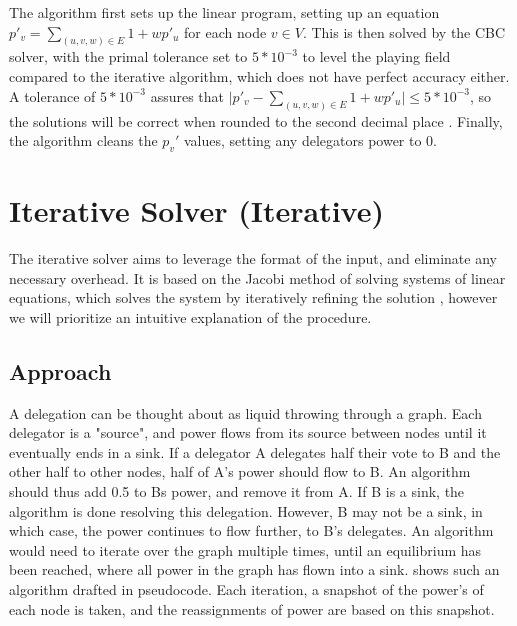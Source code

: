 The algorithm first sets up the linear program, setting up an equation $p'_v = \sum_{(u, v, w) \in E} 1 + wp'_u$ for each node $v \in V$. This is then solved by the CBC solver, with the primal tolerance set to $5*10^{-3}$ to level the playing field compared to the iterative algorithm, which does not have perfect accuracy either. A tolerance of $5 * 10^{-3}$ assures that $\lvert p'_v -\sum_{(u, v, w) \in E} 1 + wp'_u \rvert \le 5*10^{-3}$, so the solutions will be correct when rounded to the second decimal place \cite{forrestCBCUserGuide2005}. Finally, the algorithm cleans the $p_v'$ values, setting any delegators power to 0. 



\section{Iterative Solver (Iterative)}

The iterative solver aims to leverage the format of the input, and eliminate any necessary overhead. It is based on the Jacobi method of solving systems of linear equations, which solves the system by iteratively refining the solution , however we will prioritize an intuitive explanation of the procedure.

\subsection{Approach}

A delegation can be thought about as liquid throwing through a graph. Each delegator is a "source", and power flows from its source between nodes until it eventually ends in a sink. If a delegator A delegates half their vote to B and the other half to other nodes, half of A's power should flow to B. An algorithm should thus add 0.5 to Bs power, and remove it from A. If B is a sink, the algorithm is done resolving this delegation. However,  B may not be a sink, in which case, the power continues to flow further, to B's delegates. An algorithm would need to iterate over the graph multiple times, until an equilibrium has been reached, where all power in the graph has flown into a sink.  shows such an algorithm drafted in pseudocode. Each iteration, a snapshot of the power's of each node is taken, and the reassignments of power are based on this snapshot\footnotemark.  

